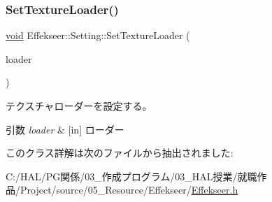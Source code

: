 \subsubsection{\texorpdfstring{Set\+Texture\+Loader()}{SetTextureLoader()}}
{\footnotesize\ttfamily \mbox{\hyperlink{namespace_effekseer_ab34c4088e512200cf4c2716f168deb56}{void}} Effekseer\+::\+Setting\+::\+Set\+Texture\+Loader (\begin{DoxyParamCaption}\item[{\mbox{\hyperlink{class_effekseer_1_1_texture_loader}{Texture\+Loader}} $\ast$}]{loader }\end{DoxyParamCaption})}



テクスチャローダーを設定する。 


\begin{DoxyParams}{引数}
{\em loader} & \mbox{[}in\mbox{]} ローダー \\
\hline
\end{DoxyParams}


このクラス詳解は次のファイルから抽出されました\+:\begin{DoxyCompactItemize}
\item 
C\+:/\+H\+A\+L/\+P\+G関係/03\+\_\+作成プログラム/03\+\_\+\+H\+A\+L授業/就職作品/\+Project/source/05\+\_\+\+Resource/\+Effekseer/\mbox{\hyperlink{_effekseer_8h}{Effekseer.\+h}}\end{DoxyCompactItemize}

